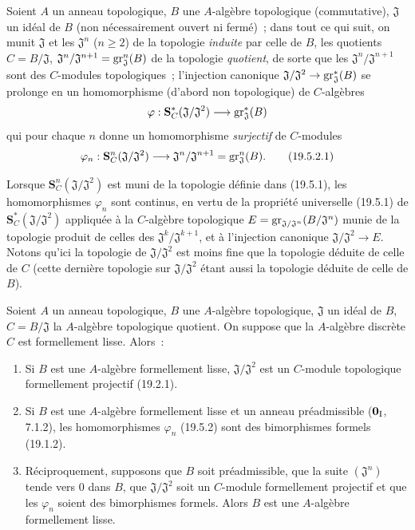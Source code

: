 \begin{env}[19.5.2]
\label{0.19.5.2-fr}
Soient $A$ un anneau topologique, $B$ une $A$-algèbre topologique
(commutative), $\mathfrak J$ un idéal de $B$ (non nécessairement ouvert ni
fermé)~; dans tout ce qui suit, on munit $\mathfrak J$ et les
$\mathfrak J^n$ ($n\geq2$) de la topologie \emph{induite} par celle de $B$,
les quotients $C=B/\mathfrak J$,
$\mathfrak J^n/\mathfrak J^{n+1}=\operatorname{gr}_{\mathfrak J}^n(B)$ de la topologie
\emph{quotient}, de sorte que les $\mathfrak J^n/\mathfrak J^{n+1}$ sont des
$C$-modules topologiques~; l'injection canonique
$\mathfrak J/\mathfrak J^2\to\operatorname{gr}_{\mathfrak J}^*(B)$ se prolonge en un
homomorphisme (d'abord non topologique) de $C$-algèbres
\[
  \varphi:\mathbf S_C^*(\mathfrak J/\mathfrak J^2)
  \longrightarrow\operatorname{gr}_{\mathfrak J}^*(B)
\]
qui pour chaque $n$ donne un homomorphisme \emph{surjectif} de $C$-modules
\begin{equation}
\label{0.19.5.2.1-fr}
  \varphi_n:\mathbf S_C^n(\mathfrak J/\mathfrak J^2)
  \longrightarrow\mathfrak J^n/\mathfrak J^{n+1}
  =\operatorname{gr}_{\mathfrak J}^n(B).
  \tag{19.5.2.1}
\end{equation}


Lorsque $\mathbf S_C^n(\mathfrak J/\mathfrak J^2)$ est muni de la topologie
définie dans (19.5.1), les homomorphismes $\varphi_n$ sont continus, en vertu
de la propriété universelle (19.5.1) de
$\mathbf S_C^*(\mathfrak J/\mathfrak J^2)$ appliquée à la $C$-algèbre
topologique $E=\operatorname{gr}_{\mathfrak J/\mathfrak J^n}(B/\mathfrak J^n)$ munie de la
topologie produit de celles des $\mathfrak J^k/\mathfrak J^{k+1}$, et à
l'injection canonique $\mathfrak J/\mathfrak J^2\to E$. Notons qu'ici la
topologie de $\mathfrak J/\mathfrak J^2$ est moins fine que la topologie
déduite de celle de $C$ (cette dernière topologie sur
$\mathfrak J/\mathfrak J^2$ étant aussi la topologie déduite de celle de $B$).
\end{env}

\begin{theorem}[19.5.3]
\label{0.19.5.3-fr}
Soient $A$ un anneau topologique, $B$ une $A$-algèbre topologique,
$\mathfrak J$ un idéal de $B$, $C=B/\mathfrak J$ la $A$-algèbre topologique
quotient. On suppose que la $A$-algèbre discrète $C$ est formellement lisse.
Alors~:
\begin{enumerate}
  \item[\rm(i)] Si $B$ est une $A$-algèbre formellement lisse,
  $\mathfrak J/\mathfrak J^2$ est un $C$-module topologique formellement
  projectif (19.2.1).
  \item[\rm(ii)] Si $B$ est une $A$-algèbre formellement lisse et un anneau
  préadmissible ($\mathbf 0_{\rm I}$, 7.1.2), les homomorphismes $\varphi_n$
  (19.5.2) sont des bimorphismes formels (19.1.2).
  \item[\rm(iii)] Réciproquement, supposons que $B$ soit préadmissible, que la
  suite $(\mathfrak J^n)$ tende vers $0$ dans $B$, que
  $\mathfrak J/\mathfrak J^2$ soit un $C$-module formellement projectif et que
  les $\varphi_n$ soient des bimorphismes formels. Alors $B$ est une
  $A$-algèbre formellement lisse.
\end{enumerate}
\end{theorem}

